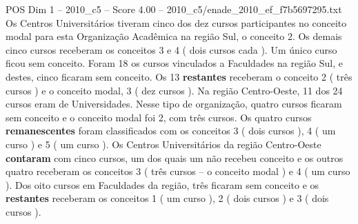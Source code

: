 \begin{textsample}{POS Dim 1 – 2010\_c5 – Score 4.00 – 2010\_c5/enade\_2010\_ef\_f7b5697295.txt}
Os Centros Universitários tiveram cinco dos dez cursos participantes no conceito modal para esta Organização Acadêmica na região Sul, o conceito 2.
Os demais cinco cursos receberam os conceitos 3 e 4 ( dois cursos cada ).
Um único curso ficou sem conceito.
Foram 18 os cursos vinculados a Faculdades na região Sul, e destes, cinco ficaram sem conceito.
Os 13 \textbf{restantes} receberam o conceito 2 ( três cursos ) e o conceito modal, 3 ( dez cursos ).
Na região Centro-Oeste, 11 dos 24 cursos eram de Universidades.
Nesse tipo de organização, quatro cursos ficaram sem conceito e o conceito modal foi 2, com três cursos.
Os quatro cursos \textbf{remanescentes} foram classificados com os conceitos 3 ( dois cursos ), 4 ( um curso ) e 5 ( um curso ).
Os Centros Universitários da região Centro-Oeste \textbf{contaram} com cinco cursos, um dos quais um não recebeu conceito e os outros quatro receberam os conceitos 3 ( três cursos – o conceito modal ) e 4 ( um curso ).
Dos oito cursos em Faculdades da região, três ficaram sem conceito e os \textbf{restantes} receberam os conceitos 1 ( um curso ), 2 ( dois cursos ) e 3 ( dois cursos ).

\end{textsample}
